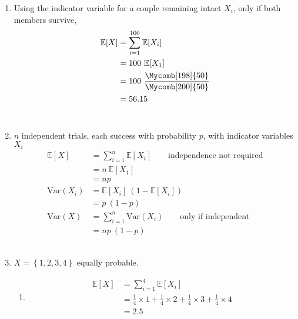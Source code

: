 \begin{enumerate}
	
	\item Using the indicator variable for a couple remaining intact $ X_i $, only if both members survive, \\
	
		\begin{align}
			\mathbb{E}[X] &= \sum\limits_{i = 1}^{100} \mathbb{E}[X_i] \nonumber \\
			&= 100\ \mathbb{E}[X_1] \nonumber \\
			&= 100\ \frac{\Mycomb[198]{50}}{\Mycomb[200]{50}} \nonumber \\
			&= 56.15
		\end{align} \\
	
	
	\item $ n $ independent trials, each success with probability $ p $, with indicator variables $ X_i $ \\
	
		\begin{align}
			\mathbb{E}[X] &= \sum\limits_{i = 1}^{n} \mathbb{E}[X_i] \qquad \text{independence not required} \nonumber \\
			&= n\ \mathbb{E}[X_1] \nonumber \\
			&= np   \\
			\mathrm{Var}(X_i) &= \mathbb{E}[X_i]\ (1 - \mathbb{E}[X_i]) \nonumber \\
			&= p\ (1 - p) \nonumber \\
			\mathrm{Var}(X) &= \sum\limits_{i = 1}^{n} \mathrm{Var}(X_i) \qquad \text{only if independent} \nonumber \\
			&= np\ (1-p)
		\end{align} \\
	
	
	\item $X = \left\{1, 2, 3, 4\right\} $ equally probable. \\
	
		\begin{enumerate}
			
			\item 	\begin{align}
				\mathbb{E}[X] &= \sum\limits_{i = 1}^{4} \mathbb{E}[X_i] \nonumber \\
				&= \frac{1}{4} \times 1 + \frac{1}{4} \times 2 + \frac{1}{4} \times 3 + \frac{1}{4} \times 4 \nonumber \\
				&= 2.5   \\
			\end{align} \\
			

\end{enumerate}
\end{enumerate}
